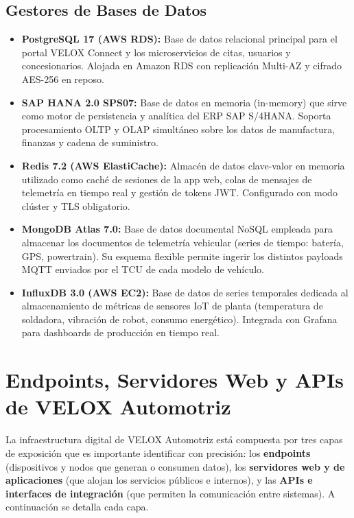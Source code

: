 \documentclass[letterpaper,11pt]{article}
\begin{document}
\subsection{Gestores de Bases de Datos}
\begin{itemize}[leftmargin=1.5cm]
    \item \textbf{PostgreSQL 17 (AWS RDS):} Base de datos relacional principal para el portal VELOX Connect y los microservicios de citas, usuarios y concesionarios. Alojada en Amazon RDS con replicación Multi-AZ y cifrado AES-256 en reposo.
    \item \textbf{SAP HANA 2.0 SPS07:} Base de datos en memoria (in-memory) que sirve como motor de persistencia y analítica del ERP SAP S/4HANA. Soporta procesamiento OLTP y OLAP simultáneo sobre los datos de manufactura, finanzas y cadena de suministro.
    \item \textbf{Redis 7.2 (AWS ElastiCache):} Almacén de datos clave-valor en memoria utilizado como caché de sesiones de la app web, colas de mensajes de telemetría en tiempo real y gestión de tokens JWT. Configurado con modo clúster y TLS obligatorio.
    \item \textbf{MongoDB Atlas 7.0:} Base de datos documental NoSQL empleada para almacenar los documentos de telemetría vehicular (series de tiempo: batería, GPS, powertrain). Su esquema flexible permite ingerir los distintos payloads MQTT enviados por el TCU de cada modelo de vehículo.
    \item \textbf{InfluxDB 3.0 (AWS EC2):} Base de datos de series temporales dedicada al almacenamiento de métricas de sensores IoT de planta (temperatura de soldadora, vibración de robot, consumo energético). Integrada con Grafana para dashboards de producción en tiempo real.
\end{itemize}

\section{Endpoints, Servidores Web y APIs de VELOX Automotriz}

La infraestructura digital de VELOX Automotriz está compuesta por tres capas de exposición que es importante identificar con precisión: los \textbf{endpoints} (dispositivos y nodos que generan o consumen datos), los \textbf{servidores web y de aplicaciones} (que alojan los servicios públicos e internos), y las \textbf{APIs e interfaces de integración} (que permiten la comunicación entre sistemas). A continuación se detalla cada capa.
\end{document}
